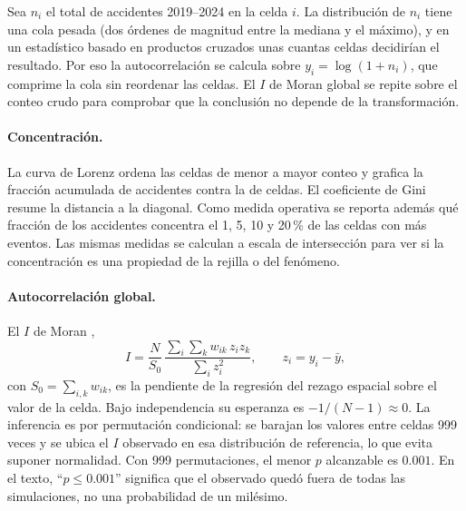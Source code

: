 Sea $n_i$ el total de accidentes 2019--2024 en la celda $i$. La distribución
de $n_i$ tiene una cola pesada (dos órdenes de magnitud entre la mediana y
el máximo), y en un estadístico basado en productos cruzados unas cuantas
celdas decidirían el resultado. Por eso la autocorrelación se calcula sobre
$y_i = \log(1 + n_i)$, que comprime la cola sin reordenar las celdas. El $I$
de Moran global se repite sobre el conteo crudo para comprobar que la
conclusión no depende de la transformación.

\paragraph{Concentración.} La curva de Lorenz ordena las celdas de menor a
mayor conteo y grafica la fracción acumulada de accidentes contra la de
celdas. El coeficiente de Gini resume la distancia a la diagonal. Como
medida operativa se reporta además qué fracción de los accidentes concentra
el 1, 5, 10 y 20\,\% de las celdas con más eventos. Las mismas medidas se
calculan a escala de intersección para ver si la concentración es una
propiedad de la rejilla o del fenómeno.

\paragraph{Autocorrelación global.} El $I$ de Moran \parencite{moran1950notes},
\begin{equation}
	I = \frac{N}{S_0}\,
	\frac{\sum_i \sum_k w_{ik}\, z_i z_k}{\sum_i z_i^2},
	\qquad z_i = y_i - \bar{y},
\end{equation}
con $S_0 = \sum_{i,k} w_{ik}$, es la pendiente de la regresión del rezago
espacial sobre el valor de la celda. Bajo independencia su esperanza es
$-1/(N-1) \approx 0$. La inferencia es por permutación condicional: se
barajan los valores entre celdas 999 veces y se ubica el $I$ observado en
esa distribución de referencia, lo que evita suponer normalidad. Con 999
permutaciones, el menor $p$ alcanzable es $0.001$. En el texto, ``$p \le
	0.001$'' significa que el observado quedó fuera de todas las simulaciones,
no una probabilidad de un milésimo.

